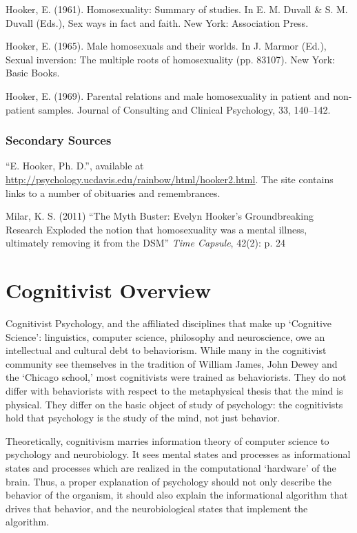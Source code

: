 \begin{refsection}
Hooker, E. (1961). Homosexuality: Summary of studies. In E. M. Duvall \& S. M. Duvall (Eds.), Sex ways in fact and faith. New York: Association Press.

Hooker, E. (1965). Male homosexuals and their worlds. In J. Marmor (Ed.), Sexual inversion: The multiple roots of homosexuality (pp. 83107). New York: Basic Books.

Hooker, E. (1969). Parental relations and male homosexuality in patient and non-patient samples. Journal of Consulting and Clinical Psychology, 33, 140--142.

\subsection{Secondary Sources}
\label{secondarysources}

“E. Hooker, Ph. D.”, available at \url{http://psychology.ucdavis.edu/rainbow/html/hooker2.html}. The site contains links to a number of obituaries and remembrances.

Milar, K. S. (2011) “The Myth Buster: Evelyn Hooker's Groundbreaking Research Exploded the notion that homosexuality was a mental illness, ultimately removing it from the DSM” \emph{Time Capsule}, 42(2): p. 24

\pagebreak 

\chapter{Cognitivist Overview}
\label{cognitivistoverview}

Cognitivist Psychology, and the affiliated disciplines that make up `Cognitive Science': linguistics, computer science, philosophy and neuroscience, owe an intellectual and cultural debt to behaviorism. While many in the cognitivist community see themselves in the tradition of William James, John Dewey and the `Chicago school,' most cognitivists were trained as behaviorists. They do not differ with behaviorists with respect to the metaphysical thesis that the mind is physical. They differ on the basic object of study of psychology: the cognitivists hold that psychology is the study of the mind, not just behavior.

Theoretically, cognitivism marries information theory of computer science to psychology and neurobiology. It sees mental states and processes as informational states and processes which are realized in the computational `hardware' of the brain. Thus, a proper explanation of psychology should not only describe the behavior of the organism, it should also explain the informational algorithm that drives that behavior, and the neurobiological states that implement the algorithm.


\end{refsection}

